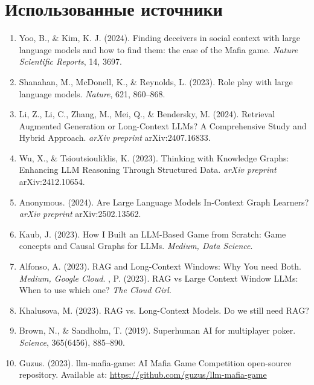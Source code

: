 \documentclass[a4paper,12pt]{article}
\begin{document}
\section*{Использованные источники}

\begin{enumerate}
    \item Yoo, B., \& Kim, K. J. (2024). Finding deceivers in social context with large language models and how to find them: the case of the Mafia game. \textit{Nature Scientific Reports}, 14, 3697.
    \item Shanahan, M., McDonell, K., \& Reynolds, L. (2023). Role play with large language models. \textit{Nature}, 621, 860--868.
    \item Li, Z., Li, C., Zhang, M., Mei, Q., \& Bendersky, M. (2024). Retrieval Augmented Generation or Long-Context LLMs? A Comprehensive Study and Hybrid Approach. \textit{arXiv preprint} arXiv:2407.16833.
    \item Wu, X., \& Tsioutsiouliklis, K. (2023). Thinking with Knowledge Graphs: Enhancing LLM Reasoning Through Structured Data. \textit{arXiv preprint} arXiv:2412.10654.
    \item Anonymous. (2024). Are Large Language Models In-Context Graph Learners? \textit{arXiv preprint} arXiv:2502.13562.
    \item Kaub, J. (2023). How I Built an LLM-Based Game from Scratch: Game concepts and Causal Graphs for LLMs. \textit{Medium, Data Science}.
    \item Alfonso, A. (2023). RAG and Long-Context Windows: Why You need Both. \textit{Medium, Google Cloud}.
    \itemadia, P. (2023). RAG vs Large Context Window LLMs: When to use which one? \textit{The Cloud Girl}.
    \item Khalusova, M. (2023). RAG vs. Long-Context Models. Do we still need RAG?
    \item Brown, N., \& Sandholm, T. (2019). Superhuman AI for multiplayer poker. \textit{Science}, 365(6456), 885--890.
    \item Guzus. (2023). llm-mafia-game: AI Mafia Game Competition open-source repository. Available at: \url{https://github.com/guzus/llm-mafia-game}
\end{enumerate}
\end{document}
